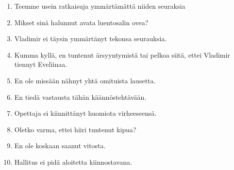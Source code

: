 \documentclass[paper=a4, fontsize=11pt]{scrartcl}
\begin{document}
\begin{enumerate}
    \item Teemme usein ratkaisuja ymmärtämättä niiden seuraksia \\
    \underline{\hspace{12cm}}
    \item Mikset sinä halunnut avata luentosalin ovea? \\
    \underline{\hspace{12cm}}
    \item Vladimir ei täysin ymmärtänyt tekonsa seurauksia.  \\
    \underline{\hspace{12cm}}
    \item Kumma kyllä, en tuntenut ärsyyntymistä tai pelkoa siitä, ettei Vladimir tiennyt Eveliinaa.\\
    \underline{\hspace{12cm}}
    \item En ole missään nähnyt yhtä omituista lausetta.\\
    \underline{\hspace{12cm}}
    \item En tiedä vastausta tähän käännöstehtävään.\\
    \underline{\hspace{12cm}}
    \item Opettaja ei kiinnittänyt huomiota virheeseensä.\\
    \underline{\hspace{12cm}}
    \item Oletko varma, ettei hiiri tuntenut kipua?\\
    \underline{\hspace{12cm}}
    \item En ole koskaan saanut vitosta.\\
    \underline{\hspace{12cm}}
    \item Hallitus ei pidä aloitetta kiinnostavana.\\
    \underline{\hspace{12cm}}
\end{enumerate}
\end{document}
